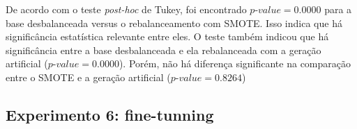 De acordo com o teste \textit{post-hoc} de Tukey, foi encontrado $\textit{p-value} = 0.0000$ para a base desbalanceada versus o rebalanceamento com SMOTE. Isso indica que há significância estatística relevante entre eles. O teste também indicou que há significância entre a base desbalanceada e ela rebalanceada com a geração artificial ($\textit{p-value} = 0.0000$). Porém, não há diferença significante na comparação entre o SMOTE e a geração artificial ($\textit{p-value} = 0.8264$)



\FloatBarrier
\subsection{Experimento 6: fine-tunning}





